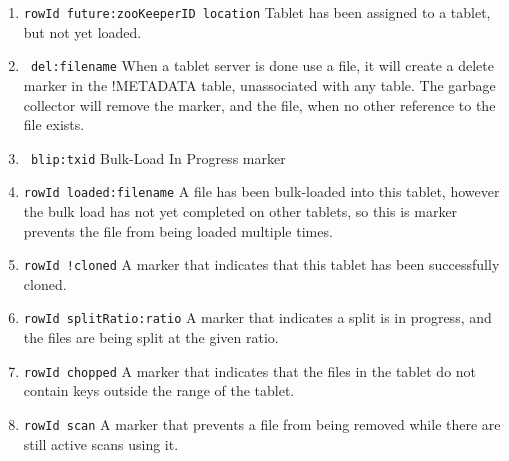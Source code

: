 \begin{enumerate}
\item{\texttt{rowId future:zooKeeperID location} Tablet has been assigned to a tablet, but not yet loaded.}
\item{\texttt{~del:filename} When a tablet server is done use a file, it will create a delete marker in the !METADATA table, unassociated with any table.  The garbage collector will remove the marker, and the file, when no other reference to the file exists.}
\item{\texttt{~blip:txid} Bulk-Load In Progress marker}
\item{\texttt{rowId loaded:filename} A file has been bulk-loaded into this tablet, however the bulk load has not yet completed on other tablets, so this is marker prevents the file from being loaded multiple times.}
\item{\texttt{rowId !cloned} A marker that indicates that this tablet has been successfully cloned.}
\item{\texttt{rowId splitRatio:ratio} A marker that indicates a split is in progress, and the files are being split at the given ratio.}
\item{\texttt{rowId chopped} A marker that indicates that the files in the tablet do not contain keys outside the range of the tablet.}
\item{\texttt{rowId scan} A marker that prevents a file from being removed while there are still active scans using it.}

\end{enumerate}


\section{}

